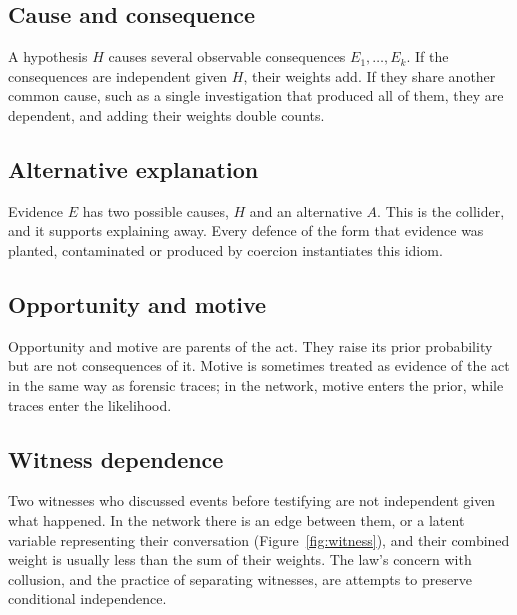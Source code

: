 \subsection{Cause and consequence}

A hypothesis $H$ causes several observable consequences $E_1, \ldots, E_k$. If the consequences are independent given $H$, their weights add. If they share another common cause, such as a single investigation that produced all of them, they are dependent, and adding their weights double counts.

\subsection{Alternative explanation}

Evidence $E$ has two possible causes, $H$ and an alternative $A$. This is the collider, and it supports explaining away. Every defence of the form that evidence was planted, contaminated or produced by coercion instantiates this idiom.

\subsection{Opportunity and motive}

Opportunity and motive are parents of the act. They raise its prior probability but are not consequences of it. Motive is sometimes treated as evidence of the act in the same way as forensic traces; in the network, motive enters the prior, while traces enter the likelihood.

\subsection{Witness dependence}

Two witnesses who discussed events before testifying are not independent given what happened. In the network there is an edge between them, or a latent variable representing their conversation (Figure~\ref{fig:witness}), and their combined weight is usually less than the sum of their weights. The law's concern with collusion, and the practice of separating witnesses, are attempts to preserve conditional independence.

